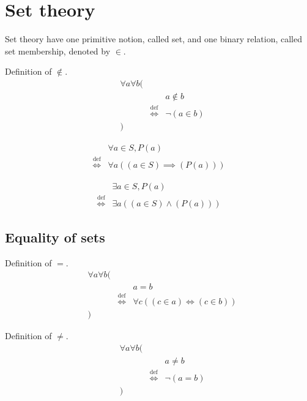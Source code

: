 \chapter{Set theory}
Set theory have one primitive notion, called set, and one binary relation, called set membership, denoted by $\in$.

\begin{defn}
\label{Definition:notin}
Definition of $\notin$.
\begin{align*}
& \forall a \forall b ( \\
& & & a \notin b \\
& & \overset{\operatorname{def}}{\iff} & \lnot (a \in b) \\
& )
\end{align*}
\end{defn}

\begin{defn}
\begin{align*}
& \forall a \in S, P(a) \\
\overset{\operatorname{def}}{\iff} & \forall a ((a \in S) \implies (P(a)))
\end{align*}
\end{defn}

\begin{defn}
\begin{align*}
& \exists a \in S, P(a) \\
\overset{\operatorname{def}}{\iff} & \exists a ((a \in S) \land (P(a)))
\end{align*}
\end{defn}

\section{Equality of sets}
\begin{defn}
\label{Definition:equality}
Definition of $=$.
\begin{align*}
& \forall a \forall b ( \\
& & & a = b \\
& & \overset{\operatorname{def}}{\iff} & \forall c ((c \in a) \iff (c \in b)) \\
& )
\end{align*}
\end{defn}

\begin{defn}
\label{Definition:neq}
Definition of $\neq$.
\begin{align*}
& \forall a \forall b ( \\
& & & a \neq b \\
& & \overset{\operatorname{def}}{\iff} & \lnot (a = b) \\
& )
\end{align*}
\end{defn}

